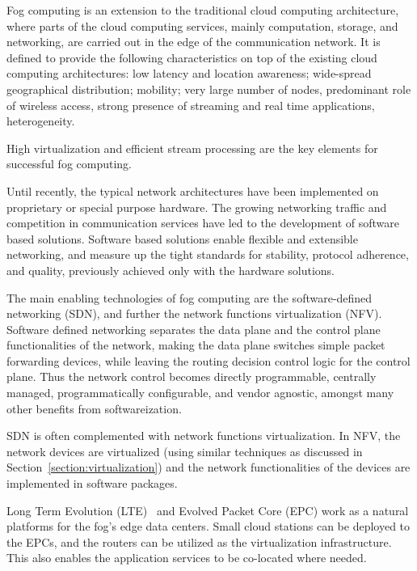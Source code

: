 Fog computing is an extension to the traditional cloud computing architecture, where parts of the cloud computing services, mainly computation, storage, and networking, are carried out in the edge of the communication network. It is defined to provide the following characteristics on top of the existing cloud computing architectures: low latency and location awareness; wide-spread geographical distribution; mobility; very large number of nodes, predominant role of wireless access, strong presence of streaming and real time applications, heterogeneity.~\cite{Bonomi:2012:Fog}

High virtualization and efficient stream processing are the key elements for successful fog computing.

Until recently, the typical network architectures have been implemented on proprietary or special purpose hardware. The growing networking traffic and competition in communication services have led to the development of software based solutions. Software based solutions enable flexible and extensible networking, and measure up the tight standards for stability, protocol adherence, and quality, previously achieved only with the hardware solutions.~\cite{Kim:2013:SDN}

The main enabling technologies of fog computing are the software-defined networking (SDN), and further the network functions virtualization (NFV). Software defined networking separates the data plane and the control plane functionalities of the network, making the data plane switches simple packet forwarding devices, while leaving the routing decision control logic for the control plane. Thus the network control becomes directly programmable, centrally managed, programmatically configurable, and vendor agnostic, amongst many other benefits from softwareization.~\cite{Kim:2013:SDN}

SDN is often complemented with network functions virtualization. In NFV, the network devices are virtualized (using similar techniques as discussed in Section~\ref{section:virtualization}) and the network functionalities of the devices are implemented in software packages.~\cite{Demestichas:2013:NFV}

Long Term Evolution (LTE)~\cite{Sesia:2009:LTE} and Evolved Packet Core (EPC) work as a natural platforms for the fog's edge data centers. Small cloud stations can be deployed to the EPCs, and the routers can be utilized as the virtualization infrastructure. This also enables the application services to be co-located where needed.~\cite{Vaquero:2014:FYW}

